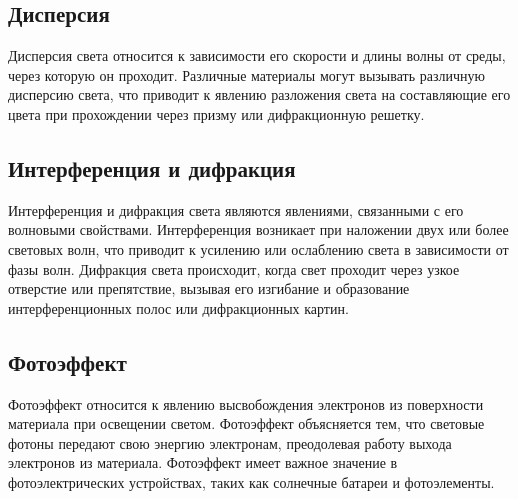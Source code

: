 \documentclass{article}
\begin{document}
\subsection{Дисперсия}
Дисперсия света относится к зависимости его скорости и длины волны от среды, через которую он проходит. Различные материалы могут вызывать различную дисперсию света, что приводит к явлению разложения света на составляющие его цвета при прохождении через призму или дифракционную решетку.
\subsection{Интерференция и дифракция}
Интерференция и дифракция света являются явлениями, связанными с его волновыми свойствами. Интерференция возникает при наложении двух или более световых волн, что приводит к усилению или ослаблению света в зависимости от фазы волн. Дифракция света происходит, когда свет проходит через узкое отверстие или препятствие, вызывая его изгибание и образование интерференционных полос или дифракционных картин.
\subsection{Фотоэффект}
Фотоэффект относится к явлению высвобождения электронов из поверхности материала при освещении светом. Фотоэффект объясняется тем, что световые фотоны передают свою энергию электронам, преодолевая работу выхода электронов из материала. Фотоэффект имеет важное значение в фотоэлектрических устройствах, таких как солнечные батареи и фотоэлементы.
\end{document}

